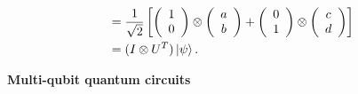 \documentclass[11pt]{article}
\begin{document}
\begin{align*}
                          &=\frac{1}{\sqrt{2}}\left[\left(\begin{array}[c]{c}1\\0\end{array}\right)\otimes\left(\begin{array}[c]{c}a\\b\end{array}\right)
    +\left(\begin{array}[c]{c}0\\1\end{array}\right)\otimes\left(\begin{array}[c]{c}c\\d\end{array}\right)\right]\\
    &=(I\otimes U^T)\ket{\psi}.
\end{align*}

\question \textbf{Multi-qubit quantum circuits}
\end{document}
